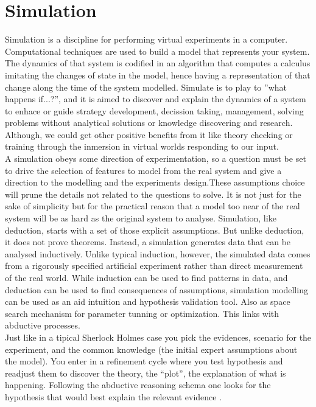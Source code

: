 \documentclass[11pt,oneside,a4paper,openright]{report}
\begin{document}
\section{Simulation}
Simulation is a discipline for performing virtual experiments in a computer. Computational techniques are used to build a model that represents your system. The dynamics of that system is codified in an algorithm that computes a calculus imitating the changes of state in the model, hence having a representation of that change along the time of the system modelled. Simulate is to play to ''what happens if...?'', and it is aimed to discover and explain the dynamics of a system to enhace or guide strategy development, decission taking, management, solving problems without analytical solutions or knowledge discovering and research. Although, we could get other positive benefits from it like theory checking or training through the inmersion in virtual worlds responding to our input.\\
A simulation obeys some direction of experimentation, so a question must be set to drive the selection of features to model from the real system and give a direction to the modelling and the experiments design.These assumptions choice will prune the details not related to the questions to solve. It is not just for the sake of simplicity but for the practical reason that a model too near of the real system will be as hard as the original system to analyse.
Simulation, like deduction, starts with a set of those explicit assumptions. But unlike deduction, it does not prove theorems. Instead, a simulation generates data that can be analysed inductively. Unlike typical induction, however, the simulated data comes from a rigorously specified artificial experiment rather than direct measurement of the real world. While induction can be used to find patterns in data, and deduction can be used to find consequences of assumptions, simulation modelling can be used as an aid intuition and hypothesis validation tool. Also as space search mechanism for parameter tunning or optimization. This links with abductive processes.\\
Just like in a tipical Sherlock Holmes case you pick the evidences, scenario for the experiment, and the common knowledge (the initial expert assumptions about the model). You enter in a refinement cycle where you test hypothesis and readjust them to discover the theory, the ``plot'', the explanation of what is happening. Following the abductive reasoning schema one looks for the hypothesis that would best explain the relevant evidence \cite{Axelrod2003}.\\
\end{document}
